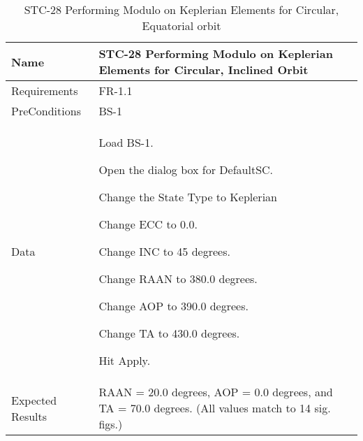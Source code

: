 \begin{table}[htbp!]
\centering
      \begin{tabular}{|p{1.05 in} |p{4.75 in} |}
      \hline
         \rowcolor[rgb]{0.8,0.8,0.8} Name & STC-28 Performing Modulo on Keplerian Elements for Circular, Inclined Orbit\\
         \hline
         Requirements & FR-1.1\\  \hline
         PreConditions & BS-1\\     \hline
         Data &
         \begin{compactenum}
             \item Load BS-1.
             \item Open the dialog box for DefaultSC.
             \item Change the State Type to Keplerian
             \item Change ECC to 0.0.
             \item Change INC to 45 degrees.
             \item Change RAAN to 380.0 degrees.
             \item Change AOP to 390.0 degrees.
             \item Change TA to 430.0 degrees.
             \item Hit Apply.
         \end{compactenum}
         \\ \hline
         Expected Results &  RAAN = 20.0 degrees, AOP = 0.0 degrees, and TA = 70.0 degrees. (All
         values match to 14 sig. figs.)\\
      \hline
      \end{tabular}
      \label{Table:STC-28}
      \caption{STC-28 Performing Modulo on Keplerian Elements for Circular, Equatorial orbit}
\end{table} 